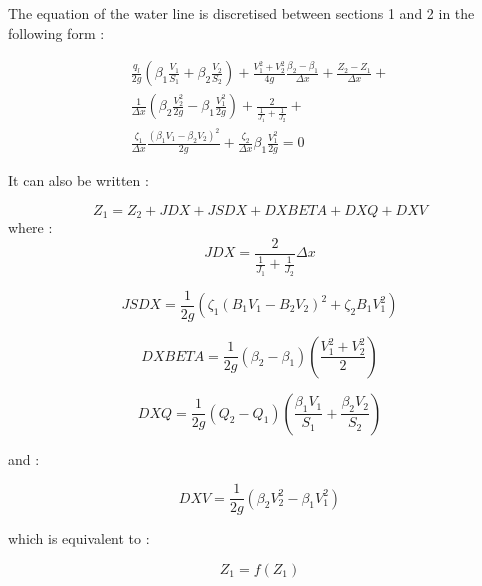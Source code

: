 The equation of the water line is discretised between sections 1 and 2 in the following form :

\begin{eqnarray}
  \frac{q_l}{2 g} \left ( \beta_1 \frac{V_1}{S_1} + \beta_2 \frac{V_2}{S_2} \right ) + \frac{V_{1}^2+V_{2}^2}{4 g} \frac{\beta_2 - \beta_1}{\Delta x} + \frac{Z_2-Z_1}{\Delta x} + \nonumber \\
  \frac{1}{\Delta x} \left ( \beta_2 \frac{V_{2}^2}{2 g} - \beta_1 \frac{V_{1}^2}{2 g}  \right ) + \frac{2}{\displaystyle \frac{1}{J_1}+\frac{1}{J_2}} + \nonumber \\
  \frac{\zeta_1}{\Delta x} \frac{\left ( \beta_1 V_1 - \beta_2 V_2 \right ) ^2 }{2 g} + \frac{\zeta_2}{\Delta x} \beta_1 \frac{V_{1}^2}{2 g} = 0
  \label{Dyn5}
\end{eqnarray}

It can also be written :

\begin{equation}
  Z_1 = Z_2 + JDX + JSDX + DXBETA + DXQ + DXV
\end{equation}
where :
\begin{equation}
  JDX = \frac{2}{\displaystyle \frac{1}{J_1} + \frac{1}{J_2}} \Delta x
\end{equation}

\begin{equation}
  JSDX = \frac{1}{2 g} \left ( \zeta_1 \left ( B_1 V_1 - B_2 V_2 \right )^2 + \zeta_2 B_1 V_{1}^2 \right )
\end{equation}

\begin{equation}
  DXBETA = \frac{1}{2 g}(\beta_2 - \beta_1) \left ( \frac{V_{1}^2 + V_{2}^2}{2} \right )
\end{equation}

\begin{equation}
  DXQ = \frac{1}{2 g}(Q_2 - Q_1) \left ( \frac{\beta_1 V_1}{S_1} + \frac{\beta_2 V_2}{S_2} \right )
\end{equation}

and :

\begin{equation}
  DXV = \frac{1}{2 g} ( \beta_2 V_{2}^2 - \beta_1 V_{1}^2 )
\end{equation}

which is equivalent to :

\begin{equation}
  \label{ptfix}
  Z_1 = f(Z_1)
\end{equation}

